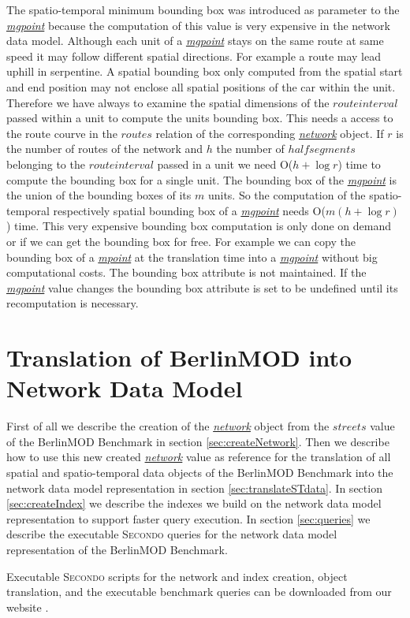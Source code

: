 \documentclass[a4paper]{article}
\newcommand{\secondo}{\textsc{Secondo}}
\newcommand{\bmodb} {BerlinMOD Benchmark}
\newcommand{\dt}[1]{\textsl{\underline{#1}}}
\begin{document}
{The spatio-temporal minimum bounding box was introduced as parameter to the
\dt{mgpoint} because the computation of this value is very expensive in the
network data model. Although each unit of a \dt{mgpoint} stays on the same route
at same speed it may follow different spatial directions. For example a route may
lead uphill in serpentine. A spatial bounding box only computed from the spatial
start and end position may not enclose all spatial positions of the car within
the unit. Therefore we have always to examine the spatial dimensions of the
$route interval$ passed within a unit to compute the units bounding box. This
needs a access to the route courve in the $routes$ relation of the corresponding
\dt{network} object. If $r$ is the number of routes
of the network and $h$ the number of $half segments$ belonging to the $route interval$
passed in a unit we need O($h + \log r$) time to
compute the bounding box for a single unit. The bounding box of the \dt{mgpoint}
is the union of the bounding boxes of its $m$ units. So the computation of the
spatio-temporal respectively spatial bounding box of a \dt{mgpoint} needs
O($m(h + \log r)$) time. This very expensive bounding box computation is only done
on demand or if we can get the bounding box for free. For example we can copy
the bounding box of a \dt{mpoint} at the translation time into a \dt{mgpoint}
without big computational costs. The bounding box attribute is not maintained. If
the \dt{mgpoint} value changes the bounding box attribute is set to be undefined
until its recomputation is necessary.
\section{Translation of BerlinMOD into Network Data Model}
\label{sec:Translation}
First of all we describe the creation of the \dt{network} object from the $streets$
value of the \bmodb{} in section \ref{sec:createNetwork}. Then we describe how
to use this new created \dt{network} value as reference for the translation of
all spatial and spatio-temporal data objects of the \bmodb{} into the network data
model representation in section \ref{sec:translateSTdata}.
In section \ref{sec:createIndex} we describe the indexes we build on the network
data model representation to support faster query execution.
In section \ref{sec:queries} we describe the executable \secondo{} queries for the
network data model representation of the \bmodb{}.

Executable \secondo{} scripts for the network and index creation, object translation,
and the executable benchmark queries can be downloaded from our website
\cite{berlinmodweb}.
}
\end{document}
